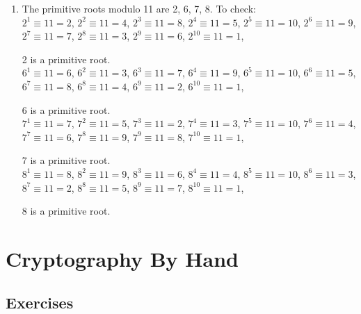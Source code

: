 {\begin{enumerate}
\begin{enumerate}[label=(\roman*)]
                        \(3\) is a primitive root.
              \end{enumerate}
        \item The primitive roots modulo 11 are 2, 6, 7, 8. To check: \\
              \(2^1 \equiv 11 = 2\), \(2^2 \equiv 11 = 4\), \(2^3 \equiv 11 = 8\), \(2^4 \equiv 11 = 5\), \(2^5 \equiv 11 = 10\), \(2^6 \equiv 11 = 9\), \(2^7 \equiv 11 = 7\), \(2^8 \equiv 11 = 3\), \(2^9 \equiv 11 = 6\), \(2^{10} \equiv 11 = 1\),

              2 is a primitive root. \\

              \(6^1 \equiv 11 = 6\), \(6^2 \equiv 11 = 3\), \(6^3 \equiv 11 = 7\), \(6^4 \equiv 11 = 9\), \(6^5 \equiv 11 = 10\), \(6^6 \equiv 11 = 5\), \(6^7 \equiv 11 = 8\), \(6^8 \equiv 11 = 4\), \(6^9 \equiv 11 = 2\), \(6^{10} \equiv 11 = 1\),

              6 is a primitive root. \\

              \(7^1 \equiv 11 = 7\), \(7^2 \equiv 11 = 5\), \(7^3 \equiv 11 = 2\), \(7^4 \equiv 11 = 3\), \(7^5 \equiv 11 = 10\), \(7^6 \equiv 11 = 4\), \(7^7 \equiv 11 = 6\), \(7^8 \equiv 11 = 9\), \(7^9 \equiv 11 = 8\), \(7^{10} \equiv 11 = 1\),

              7 is a primitive root. \\

              \(8^1 \equiv 11 = 8\), \(8^2 \equiv 11 = 9\), \(8^3 \equiv 11 = 6\), \(8^4 \equiv 11 = 4\), \(8^5 \equiv 11 = 10\), \(8^6 \equiv 11 = 3\), \(8^7 \equiv 11 = 2\), \(8^8 \equiv 11 = 5\), \(8^9 \equiv 11 = 7\), \(8^{10} \equiv 11 = 1\),

              8 is a primitive root.
    \end{enumerate}
}
\renewcommand{\theenumi}{\arabic{enumi}}
\renewcommand{\labelenumi}{\theenumi.}
\section{Cryptography By Hand}

\renewcommand{\theenumi}{\alph{enumi}}
\renewcommand{\labelenumi}{(\theenumi)}
\subsection{Exercises}

